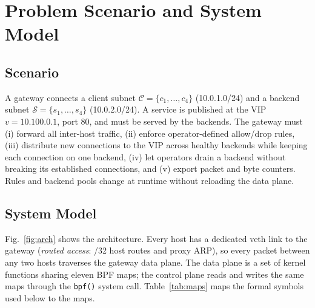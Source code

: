 \documentclass[conference]{IEEEtran}
\begin{document}
\section{Problem Scenario and System Model}
\label{sec:model}
\subsection{Scenario}
A gateway connects a client subnet $\mathcal{C}=\{c_1,\dots,c_4\}$
(10.0.1.0/24) and a backend subnet $\mathcal{S}=\{s_1,\dots,s_4\}$
(10.0.2.0/24). A service is published at the VIP $v=10.100.0.1$, port 80, and
must be served by the backends. The gateway must (i) forward all inter-host
traffic, (ii) enforce operator-defined allow/drop rules, (iii) distribute new
connections to the VIP across healthy backends while keeping each connection
on one backend, (iv) let operators drain a backend without breaking its
established connections, and (v) export packet and byte counters. Rules and
backend pools change at runtime without reloading the data plane.

\subsection{System Model}
Fig.~\ref{fig:arch} shows the architecture. Every host has a dedicated veth
link to the gateway (\textit{routed access}: /32 host routes and proxy ARP),
so every packet between any two hosts traverses the gateway data plane. The
data plane is a set of kernel functions sharing eleven BPF maps; the control
plane reads and writes the same maps through the \texttt{bpf()} system call.
Table~\ref{tab:maps} maps the formal symbols used below to the maps.
\end{document}
